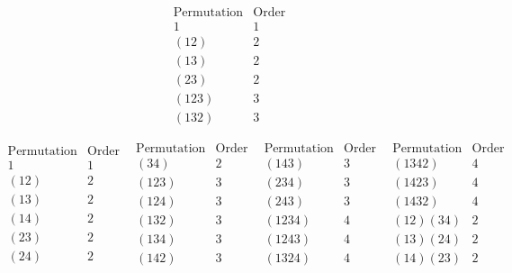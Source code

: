 \begin{solalph}
    \item
    $$\begin{array}{c|c}
        \text{Permutation} & \text{Order} \\
        \hline
        1 & 1 \\
        (12) & 2 \\
        (13) & 2 \\
        (23) & 2 \\
        (123) & 3 \\
        (132) & 3
    \end{array}$$
    \item 
    $$\begin{array}{c|c}
            \text{Permutation} & \text{Order} \\
            \hline
            1 & 1 \\
            (12) & 2 \\
            (13) & 2 \\
            (14) & 2 \\
            (23) & 2 \\
            (24) & 2
    \end{array}\enspace
    \begin{array}{c|c}
        \text{Permutation} & \text{Order} \\
        \hline
        (34) & 2 \\
        (123) & 3 \\
        (124) & 3 \\
        (132) & 3 \\
        (134) & 3 \\
        (142) & 3
    \end{array}\enspace
    \begin{array}{c|c}
        \text{Permutation} & \text{Order} \\
        \hline
        (143) & 3 \\
        (234) & 3 \\
        (243) & 3 \\
        (1234) & 4 \\
        (1243) & 4 \\
        (1324) & 4
    \end{array}\enspace
    \begin{array}{c|c}
        \text{Permutation} & \text{Order} \\
        \hline
        (1342) & 4 \\
        (1423) & 4 \\
        (1432) & 4 \\
        (12)(34) & 2 \\
        (13)(24) & 2 \\
        (14)(23) & 2
    \end{array}$$
\end{solalph}


